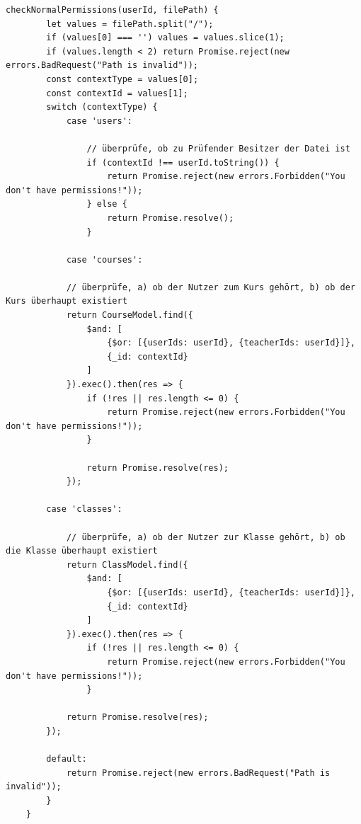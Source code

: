\begin{lstlisting}[caption=checkNormalPermissions() Funktion des filePermissionHelper, label=code:fphnormal]
	checkNormalPermissions(userId, filePath) {
		let values = filePath.split("/");
		if (values[0] === '') values = values.slice(1);
		if (values.length < 2) return Promise.reject(new errors.BadRequest("Path is invalid"));
		const contextType = values[0];
		const contextId = values[1];
		switch (contextType) {
			case 'users':
			
				// überprüfe, ob zu Prüfender Besitzer der Datei ist
				if (contextId !== userId.toString()) {
					return Promise.reject(new errors.Forbidden("You don't have permissions!"));
				} else {
					return Promise.resolve();
				}
				
			case 'courses':
			
			// überprüfe, a) ob der Nutzer zum Kurs gehört, b) ob der Kurs überhaupt existiert
			return CourseModel.find({
				$and: [
					{$or: [{userIds: userId}, {teacherIds: userId}]},
					{_id: contextId}
				]
			}).exec().then(res => {
				if (!res || res.length <= 0) {
					return Promise.reject(new errors.Forbidden("You don't have permissions!"));
				}
				
				return Promise.resolve(res);
			});
			
		case 'classes':
			
			// überprüfe, a) ob der Nutzer zur Klasse gehört, b) ob die Klasse überhaupt existiert
			return ClassModel.find({
				$and: [
					{$or: [{userIds: userId}, {teacherIds: userId}]},
					{_id: contextId}
				]
			}).exec().then(res => {
				if (!res || res.length <= 0) {
					return Promise.reject(new errors.Forbidden("You don't have permissions!"));
				}
			
			return Promise.resolve(res);
		});
		
		default:
			return Promise.reject(new errors.BadRequest("Path is invalid"));
		}
	}
\end{lstlisting}

